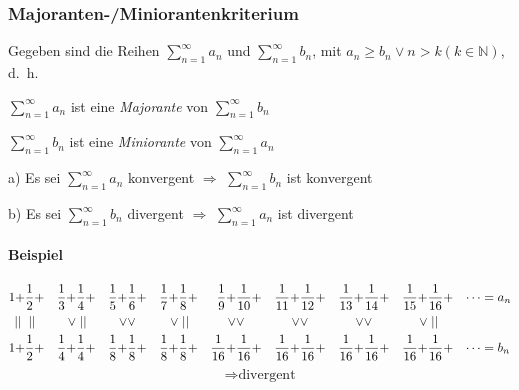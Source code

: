\subsubsection{Majoranten-/Miniorantenkriterium}

Gegeben sind die Reihen \( \sum\limits^{\infty}_{n=1} a_n \) und  \( \sum\limits^{\infty}_{n=1} b_n \), mit \( a_n \geq b_n \vee n > k (k \in \mathbb{N}) \), d.~h.

\begin{center}

\( \sum\limits^{\infty}_{n=1} a_n \) ist eine \textit{Majorante} von \( \sum\limits^{\infty}_{n=1} b_n \)


\medskip

\( \sum\limits^{\infty}_{n=1} b_n \) ist eine \textit{Miniorante} von \( \sum\limits^{\infty}_{n=1} a_n \)

\bigskip

a) Es sei \( \sum\limits^{\infty}_{n=1} a_n \) konvergent \(\Rightarrow\) \( \sum\limits^{\infty}_{n=1} b_n \) ist konvergent

\medskip

b) Es sei \( \sum\limits^{\infty}_{n=1} b_n \) divergent \(\Rightarrow\) \( \sum\limits^{\infty}_{n=1} a_n \) ist divergent

\end{center}

\paragraph{Beispiel}

\begin{align*}
    1 + & \frac{1}{2} + & \frac{1}{3} + & \frac{1}{4} + & \frac{1}{5} + &\frac{1}{6} + & \frac{1}{7} + & \frac{1}{8} + & \frac{1}{9} + & \frac{1}{10} + & \frac{1}{11} + & \frac{1}{12} + & \frac{1}{13} + & \frac{1}{14} + & \frac{1}{15} + & \frac{1}{16} + & \cdots &= a_n \\
    \mid\mid{} & \mid\mid{} & \vee & \mid\mid{} & \vee & \vee & \vee & \mid\mid{} & \vee & \vee & \vee & \vee & \vee & \vee & \vee & \mid\mid{} & & \\ 
    1 + & \frac{1}{2} + & \frac{1}{4} + & \frac{1}{4} + & \frac{1}{8} + &\frac{1}{8} + & \frac{1}{8} + & \frac{1}{8} + & \frac{1}{16} + & \frac{1}{16} + & \frac{1}{16} + & \frac{1}{16} + & \frac{1}{16} + & \frac{1}{16} + & \frac{1}{16} + & \frac{1}{16} + & \cdots &= b_n \\
\end{align*}
\[
	\Rightarrow \text{divergent}
\]

